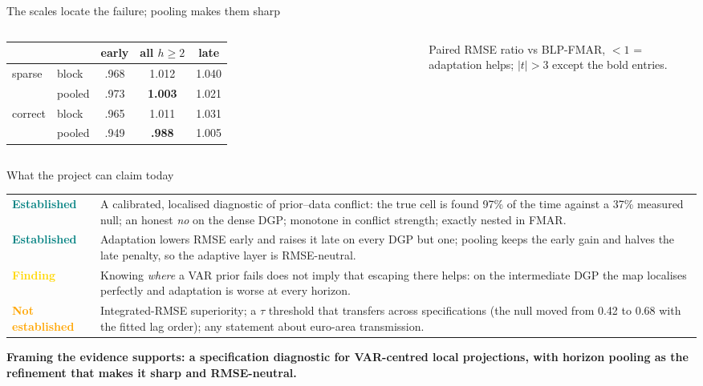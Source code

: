 \documentclass[aspectratio=169,11pt]{beamer}
\newcommand{\statusrow}[3]{%
  \textcolor{#1}{\bfseries #2} & #3\\[1.2mm]
}
\newcommand{\bigbox}[2]{%
  \colorbox{#1}{\parbox{0.955\textwidth}{\vspace{1.4mm}#2\vspace{1.4mm}}}}
\begin{document}
\begin{frame}{The scales locate the failure; pooling makes them sharp}
\begin{columns}[T,onlytextwidth]
{{\begin{tabular}{@{}llccc@{}}
        \toprule
        & & early & all $h\!\geq\!2$ & late \\
        \midrule
        sparse  & block  & .968 & 1.012 & 1.040 \\
                & pooled & .973 & \textbf{1.003} & 1.021 \\
        correct & block  & .965 & 1.011 & 1.031 \\
                & pooled & .949 & \textbf{.988} & 1.005 \\
        \bottomrule
      \end{tabular}}\par
      \vspace{0.5mm}
      {\fontsize{8.2}{9.8}\selectfont\color{MidGray}Paired RMSE ratio vs BLP-FMAR, $<1$ = adaptation helps; $|t|>3$ except the bold entries.}}
  \end{columns}
\end{frame}

\begin{frame}{What the project can claim today}
  \vspace{-1mm}
  {\fontsize{9.6}{11.6}\selectfont
  \renewcommand{\arraystretch}{1.0}
  \begin{tabularx}{\textwidth}{p{} X}
    \statusrow{Teal}{Established}{A calibrated, localised diagnostic of prior--data conflict: the true cell is found 97\% of the time against a 37\% measured null; an honest \emph{no} on the dense DGP; monotone in conflict strength; exactly nested in FMAR.}
    \statusrow{Teal}{Established}{Adaptation lowers RMSE early and raises it late on every DGP but one; pooling keeps the early gain and halves the late penalty, so the adaptive layer is RMSE-neutral.}
    \statusrow{Gold}{Finding}{Knowing \emph{where} a VAR prior fails does not imply that escaping there helps: on the intermediate DGP the map localises perfectly and adaptation is worse at every horizon.}
    \statusrow{Orange}{Not established}{Integrated-RMSE superiority; a $\tau$ threshold that transfers across specifications (the null moved from 0.42 to 0.68 with the fitted lag order); any statement about euro-area transmission.}
  \end{tabularx}}
  \vspace{0.5mm}
  \bigbox{PaleTeal}{\fontsize{10.5}{12.8}\selectfont\bfseries
      Framing the evidence supports: a specification diagnostic for VAR-centred local projections, with horizon pooling as the refinement that makes it sharp and RMSE-neutral.}
\end{frame}
\end{document}
